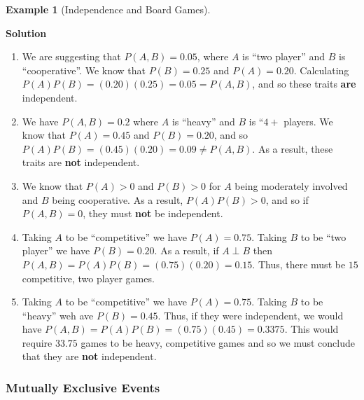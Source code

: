 \documentclass[
  letterpaper,
  DIV=11,
  numbers=noendperiod]{scrreprt}
\theoremstyle{definition}
\theoremstyle{definition}
\newtheorem{example}{Example}[chapter]
\theoremstyle{definition}
\theoremstyle{remark}
\begin{document}
\begin{example}[Independence and Board
Games]
\begin{tcolorbox}[enhanced jigsaw, colback=white, colframe=quarto-callout-color-frame, arc=.35mm, leftrule=.75mm, rightrule=.15mm, opacityback=0, breakable, bottomrule=.15mm, left=2mm, toprule=.15mm]

\vspace{-3mm}\textbf{Solution}\vspace{3mm}

\begin{enumerate}
\def\labelenumi{\alph{enumi}.}
\item
  We are suggesting that \(P(A,B) = 0.05\), where \(A\) is ``two
  player'' and \(B\) is ``cooperative''. We know that \(P(B) = 0.25\)
  and \(P(A) = 0.20\). Calculating
  \(P(A)P(B) = (0.20)(0.25) = 0.05 = P(A,B)\), and so these traits
  \textbf{are} independent.
\item
  We have \(P(A,B) = 0.2\) where \(A\) is ``heavy'' and \(B\) is
  ``\(4+\) players. We know that \(P(A) = 0.45\) and \(P(B) = 0.20\),
  and so \(P(A)P(B) = (0.45)(0.20) = 0.09 \neq P(A,B)\). As a result,
  these traits are \textbf{not} independent.
\item
  We know that \(P(A) > 0\) and \(P(B) > 0\) for \(A\) being moderately
  involved and \(B\) being cooperative. As a result, \(P(A)P(B) > 0\),
  and so if \(P(A,B) = 0\), they must \textbf{not} be independent.
\item
  Taking \(A\) to be ``competitive'' we have \(P(A) = 0.75\). Taking
  \(B\) to be ``two player'' we have \(P(B) = 0.20\). As a result, if
  \(A\perp B\) then \(P(A,B) = P(A)P(B) = (0.75)(0.20) = 0.15\). Thus,
  there must be \(15\) competitive, two player games.
\item
  Taking \(A\) to be ``competitive'' we have \(P(A) = 0.75\). Taking
  \(B\) to be ``heavy'' weh ave \(P(B) = 0.45\). Thus, if they were
  independent, we would have
  \(P(A,B) = P(A)P(B) = (0.75)(0.45) = 0.3375\). This would require
  \(33.75\) games to be heavy, competitive games and so we must conclude
  that they are \textbf{not} independent.
\end{enumerate}

\end{tcolorbox}

\end{example}

\subsubsection{Mutually Exclusive
Events}\label{mutually-exclusive-events}
\end{document}
